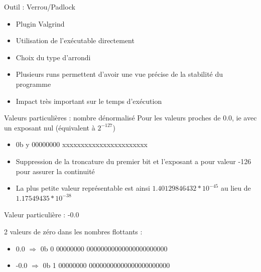 \documentclass{beamer}
\begin{document}
      
    \begin{frame}{Outil : Verrou/Padlock}
\begin{itemize}
\item Plugin Valgrind
\item Utilisation de l'exécutable directement
\item Choix du type d'arrondi
\item Plusieurs runs permettent d'avoir une vue précise de la stabilité du programme
\item Impact très important sur le temps d'exécution
\end{itemize}
  \end{frame}
    
  \begin{frame}{Valeurs particulières : nombre dénormalisé}
  Pour les valeurs proches de 0.0, ie avec un exposant nul (équivalent à $2^{-127}$)
  \begin{itemize}
  \item 0b \textcolor{SignColor}{y} \textcolor{ExponentColor}{00000000} \textcolor{FractionColor}{xxxxxxxxxxxxxxxxxxxxxxx}
  \item Suppression de la troncature du premier bit et l'exposant a pour valeur -126 pour assurer la continuité 
  \item La plus petite valeur représentable est ainsi $1.40129846432*10^{-45}$ au lieu de $1.17549435*10^{-38}$
  \end{itemize}

  \end{frame}

  \begin{frame}{Valeur particulière : -0.0}
    \begin{large}
  2 valeurs de zéro dans les nombres flottants :
  \begin{itemize}
  \item 0.0 $\Rightarrow$ 0b \textcolor{SignColor}{0} \textcolor{ExponentColor}{00000000} \textcolor{FractionColor}{00000000000000000000000} \\
  \item -0.0 $\Rightarrow$ 0b \textcolor{SignColor}{1} \textcolor{ExponentColor}{00000000} \textcolor{FractionColor}{00000000000000000000000}
  \end{itemize}
        \end{large}
  \end{frame}
\end{document}
